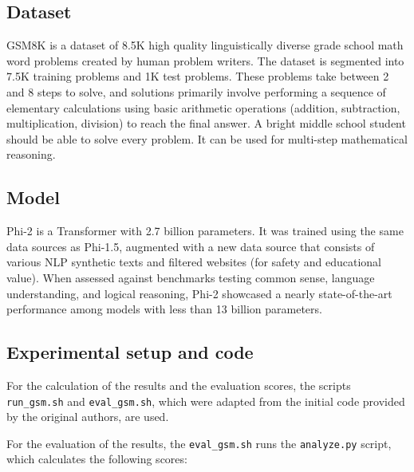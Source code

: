 \documentclass[10pt]{article} %
\begin{document}
\subsection{Dataset}

GSM8K is a dataset of 8.5K high quality linguistically diverse grade school math word problems created by human problem writers. The dataset is segmented into 7.5K training problems and 1K test problems. These problems take between 2 and 8 steps to solve, and solutions primarily involve performing a sequence of elementary calculations using basic arithmetic operations (addition, subtraction, multiplication, division)  to reach the final answer. A bright middle school student should be able to solve every problem. It can be used for multi-step mathematical reasoning.

\subsection{Model}

Phi-2 \citep{microsoft2023phi2} is a Transformer with 2.7 billion parameters. It was trained using the same data sources as Phi-1.5, augmented with a new data source that consists of various NLP synthetic texts and filtered websites (for safety and educational value). When assessed against benchmarks testing common sense, language understanding, and logical reasoning, Phi-2 showcased a nearly state-of-the-art performance among models with less than 13 billion parameters.

\subsection{Experimental setup and code}

For the calculation of the results and the evaluation scores, the scripts \texttt{run\_gsm.sh} and \texttt{eval\_gsm.sh}, which were adapted from the initial code provided by the original authors, are used.

For the evaluation of the results, the \texttt{eval\_gsm.sh} runs the \texttt{analyze.py} script, which calculates the following scores:
\end{document}
